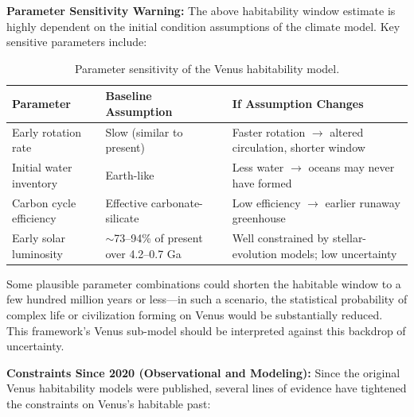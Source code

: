 \documentclass[aps,prd,twocolumn,superscriptaddress,nofootinbib]{revtex4-2}
\begin{document}
\textbf{Parameter Sensitivity Warning:} The above habitability window estimate is highly dependent on the initial condition assumptions of the climate model. Key sensitive parameters include:

\begin{table}[htbp]
\caption{Parameter sensitivity of the Venus habitability model.}
\label{tab:venus-sensitivity}
\begin{tabular}{lll}
\toprule
Parameter & Baseline Assumption & If Assumption Changes \\
\midrule
Early rotation rate & Slow (similar to present) & Faster rotation $\to$ altered circulation, shorter window \\
Initial water inventory & Earth-like & Less water $\to$ oceans may never have formed \\
Carbon cycle efficiency & Effective carbonate-silicate & Low efficiency $\to$ earlier runaway greenhouse \\
Early solar luminosity & ${\sim}$73--94\% of present over 4.2--0.7 Ga & Well constrained by stellar-evolution models; low uncertainty \\
\bottomrule
\end{tabular}
\end{table}

Some plausible parameter combinations could shorten the habitable window to a few hundred million years or less---in such a scenario, the statistical probability of complex life or civilization forming on Venus would be substantially reduced. This framework's Venus sub-model should be interpreted against this backdrop of uncertainty.

\textbf{Constraints Since 2020 (Observational and Modeling):} Since the original Venus habitability models were published, several lines of evidence have tightened the constraints on Venus's habitable past:
\end{document}
